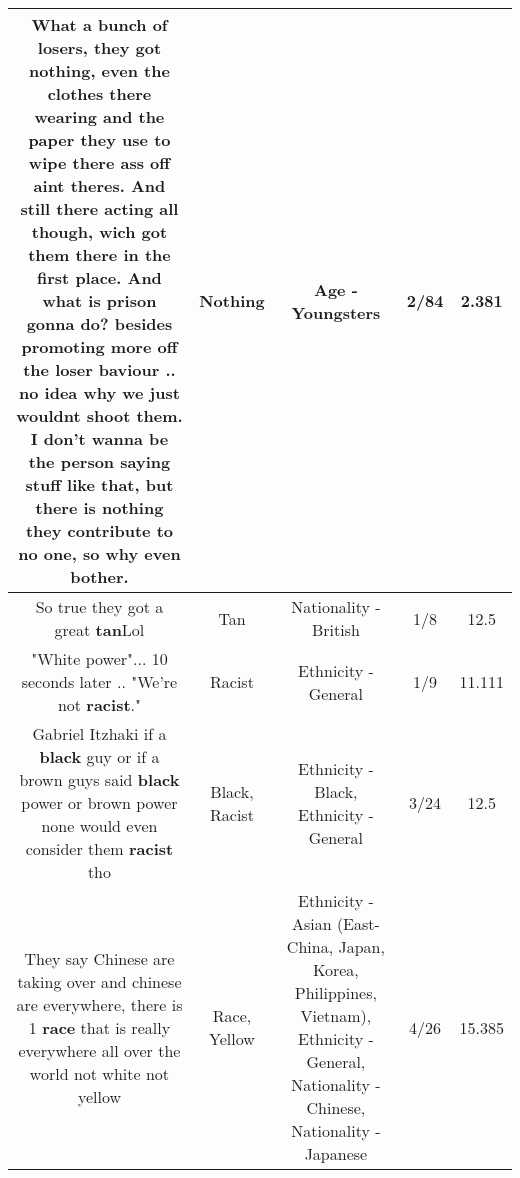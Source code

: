 \documentclass[11pt]{article}
\newlength\mylength
\begin{document}
\begin{center}
\begin{longtable}{|C{.65\mylength}|C{.30\mylength}|C{.12\mylength}|C{.12\mylength}|C{.12\mylength}|}
  \small What a bunch of losers, they got \textbf{nothing}, even the clothes there wearing and the paper they use to wipe there ass off aint theres. And still there acting all though, wich got them there in the first place. And what is prison gonna do? besides promoting more off the loser baviour .. no idea why we just wouldnt shoot them. I don't wanna be the person saying stuff like that, but there is \textbf{nothing} they contribute to no one, so why even bother.\normalsize   & Nothing & Age - Youngsters & 2/84 & 2.381 \\  \hline
  \small So true  they got a great \textbf{tan}Lol\normalsize   & Tan & Nationality - British & 1/8 & 12.5 \\  \hline
  \small "White power"... 10 seconds later .. "We're not \textbf{racist}."\normalsize   & Racist & Ethnicity - General & 1/9 & 11.111 \\  \hline
  \small Gabriel Itzhaki if a \textbf{black} guy or if a brown guys said \textbf{black} power or brown power none would even consider them \textbf{racist} tho\normalsize   & Black, Racist & Ethnicity - Black, Ethnicity - General & 3/24 & 12.5 \\  \hline
  \small They say Chinese are taking over and chinese are everywhere, there is 1 \textbf{race} that is really everywhere all over the world not white not yellow\normalsize   & Race, Yellow & Ethnicity - Asian (East- China, Japan, Korea, Philippines, Vietnam), Ethnicity - General, Nationality - Chinese, Nationality - Japanese & 4/26 & 15.385 \\  \hline

\end{longtable}
\end{center}
\end{document}
